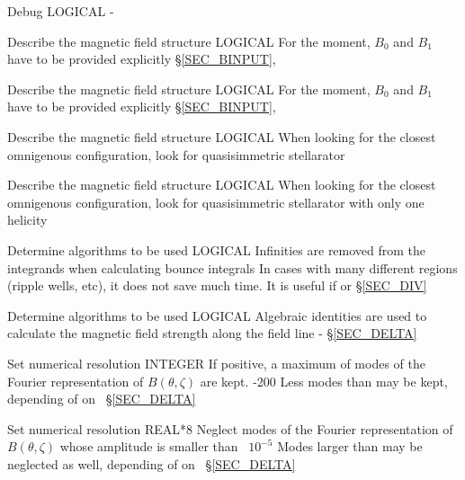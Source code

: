 {
{Debug}
{LOGICAL}
{}
{\false}
{-}
{}

{Describe the magnetic field structure}
{LOGICAL}
{}
{\false}
{For the moment, $B_0$ and $B_1$ have to be provided explicitly}
{\S\ref{SEC_BINPUT}, \citep{calvo2017sqrtnu,velasco2018phi1}}

{Describe the magnetic field structure}
{LOGICAL}
{}
{\false}
{For the moment, $B_0$ and $B_1$ have to be provided explicitly}
{\S\ref{SEC_BINPUT}, \citep{calvo2017sqrtnu,velasco2018phi1}}

{Describe the magnetic field structure}
{LOGICAL}
{When looking for the closest omnigenous configuration, look for quasisimmetric stellarator}
{\false}
{}

{Describe the magnetic field structure}
{LOGICAL}
{When looking for the closest omnigenous configuration, look for quasisimmetric stellarator with only one helicity}
{\false}
{}


{Determine algorithms to be used}
{LOGICAL}
{Infinities are removed from the integrands when calculating bounce integrals}
{\false}
{In cases with many different regions (ripple wells, etc), it does not save much time. It is useful if  or }
{\S\ref{SEC_DIV}}

{Determine algorithms to be used}
{LOGICAL}
{Algebraic identities are used to calculate the magnetic field strength along the field line}
{\true}
{-}
{\S\ref{SEC_DELTA}}

{Set numerical resolution}
{INTEGER}
{If positive, a maximum of  modes of the Fourier representation of $B(\theta,\zeta)$ are kept.}
{-200}
{Less modes than  may be kept, depending of on~}
{\S\ref{SEC_DELTA}}

{Set numerical resolution}
{REAL*8}
{Neglect modes of the Fourier representation of $B(\theta,\zeta)$ whose amplitude is smaller than~}
{$10^{-5}$}
{Modes larger than  may be neglected as well, depending of on~}
{\S\ref{SEC_DELTA}}

}
